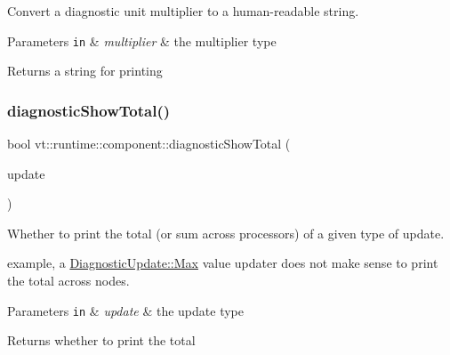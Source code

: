 Convert a diagnostic unit multiplier to a human-\/readable string. 


\begin{DoxyParams}[1]{Parameters}
\mbox{\tt in}  & {\em multiplier} & the multiplier type\\
\hline
\end{DoxyParams}
\begin{DoxyReturn}{Returns}
a string for printing 
\end{DoxyReturn}
\mbox{\label{namespacevt_1_1runtime_1_1component_a58591fba884221f50715e723f089562b}} 
\subsubsection{\texorpdfstring{diagnostic\+Show\+Total()}{diagnosticShowTotal()}}
{\footnotesize\ttfamily bool vt\+::runtime\+::component\+::diagnostic\+Show\+Total (\begin{DoxyParamCaption}\item[{\hyperlink{namespacevt_1_1runtime_1_1component_a896637e6e183a909a17bfd8d3943c206}{Diagnostic\+Update}}]{update }\end{DoxyParamCaption})}



Whether to print the total (or sum across processors) of a given type of update. 

example, a {\ttfamily \hyperlink{namespacevt_1_1runtime_1_1component_a896637e6e183a909a17bfd8d3943c206a6a061313d22e51e0f25b7cd4dc065233}{Diagnostic\+Update\+::\+Max}} value updater does not make sense to print the total across nodes.


\begin{DoxyParams}[1]{Parameters}
\mbox{\tt in}  & {\em update} & the update type\\
\hline
\end{DoxyParams}
\begin{DoxyReturn}{Returns}
whether to print the total 
\end{DoxyReturn}
\mbox{\label{namespacevt_1_1runtime_1_1component_a99c037ee6312b9c934b3606e316e0539}} 
